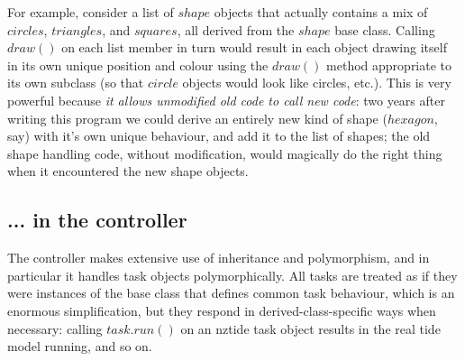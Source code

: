 \documentclass[12pt]{amsart}
\begin{document}
For example, consider a list of $shape$ objects that actually contains a
mix of $circles$, $triangles$, and $squares$, all derived from the
$shape$ base class.  Calling $draw()$ on each list member in turn would
result in each object drawing itself in its own unique position and
colour using the $draw()$ method appropriate to its own subclass (so
that $circle$ objects would look like circles, etc.). This is very
powerful because {\em it allows unmodified old code to call new code}:
two years after writing this program we could derive an entirely new
kind of shape ($hexagon$, say) with it's own unique behaviour, and add
it to the list of shapes; the old shape handling code, without
modification, would magically do the right thing when it encountered 
the new shape objects.

\subsection{... in the controller}

The controller makes extensive use of inheritance and polymorphism, and
in particular it handles task objects polymorphically. All tasks are
treated as if they were instances of the base class that defines common
task behaviour, which is an enormous simplification, but they respond in
derived-class-specific ways when necessary: calling $task.run()$ on an
nztide task object results in the real tide model running, and so on. 
\end{document}
